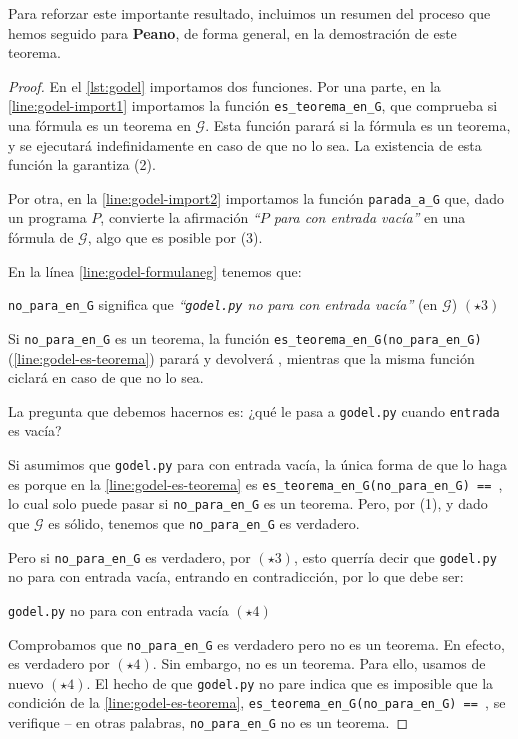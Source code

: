 Para reforzar este importante resultado, incluimos un resumen del proceso que hemos seguido para \textbf{Peano}, de forma general, en la demostración de este teorema.

\begin{proof}
En el \cref{lst:godel} importamos dos funciones. Por una parte, en la \cref{line:godel-import1} importamos la función \texttt{es\_teorema\_en\_G}, que comprueba si una fórmula es un teorema en $\mathcal{G}$. Esta función parará si la fórmula es un teorema, y se ejecutará indefinidamente en caso de que no lo sea. La existencia de esta función la garantiza (2).

Por otra, en la \cref{line:godel-import2} importamos la función \texttt{parada\_a\_G} que, dado un programa $P$, convierte la afirmación \emph{``$P$ para con entrada vacía''} en una fórmula de $\mathcal{G}$, algo que es posible por (3).

En la línea \cref{line:godel-formulaneg} tenemos que:
\begin{adjustwidth}{30pt}{}
    \texttt{no\_para\_en\_G} significa que \emph{``\texttt{godel.py} no para con entrada vacía''} (en $\mathcal{G}$)  \hfill $(\star3)$
\end{adjustwidth}
Si \texttt{no\_para\_en\_G} es un teorema, la función \texttt{es\_teorema\_en\_G(no\_para\_en\_G)} (\cref{line:godel-es-teorema}) parará y devolverá , mientras que la misma función ciclará en caso de que no lo sea.

La pregunta que debemos hacernos es: ¿qué le pasa a \texttt{godel.py} cuando \texttt{entrada} es vacía?

Si asumimos que \texttt{godel.py} para con entrada vacía, la única forma de que lo haga es porque en la \cref{line:godel-es-teorema} es \texttt{es\_teorema\_en\_G(no\_para\_en\_G) == }, lo cual solo puede pasar si \texttt{no\_para\_en\_G} es un teorema. Pero, por (1), y dado que $\mathcal{G}$ es sólido, tenemos que \texttt{no\_para\_en\_G} es verdadero.

Pero si \texttt{no\_para\_en\_G} es verdadero, por $(\star3)$, esto querría decir que \texttt{godel.py} no para con entrada vacía, entrando en contradicción, por lo que debe ser:
\begin{adjustwidth}{30pt}{}
    \texttt{godel.py} no para con entrada vacía  \hfill $(\star4)$
\end{adjustwidth}
Comprobamos que \texttt{no\_para\_en\_G} es verdadero pero no es un teorema. En efecto, es verdadero por $(\star4)$. Sin embargo, no es un teorema. Para ello, usamos de nuevo $(\star4)$. El hecho de que \texttt{godel.py} no pare indica que es imposible que la condición de la \cref{line:godel-es-teorema}, \linebreak\texttt{es\_teorema\_en\_G(no\_para\_en\_G) == }, se verifique -- en otras palabras, \texttt{no\_para\_en\_G} no es un teorema.
\end{proof}

